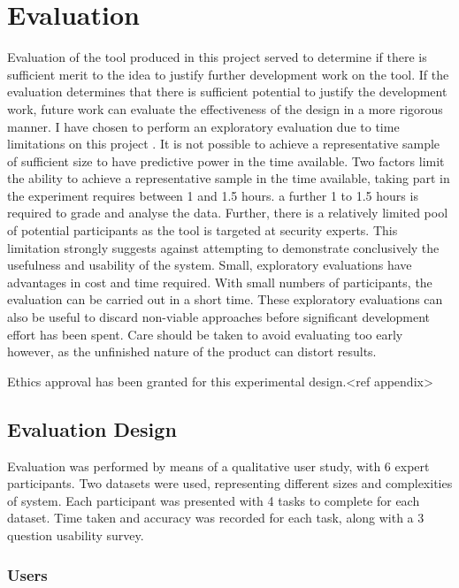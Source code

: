 \chapter{Evaluation}\label{eval}

Evaluation of the tool produced in this project served to determine if there is sufficient merit to the idea to justify further development work on the tool. If the evaluation determines that there is sufficient potential to justify the development work, future work can evaluate the effectiveness of the design in a more rigorous manner. I have chosen to perform an exploratory evaluation due to time limitations on this project \cite{Ellis:2006:EAU:1168149.1168152}. It is not possible to achieve a representative sample of sufficient size to have predictive power in the time available. Two factors limit the ability to achieve a representative sample in the time available, taking part in the experiment requires between 1 and 1.5 hours. a further 1 to 1.5 hours is required to grade and analyse the data. Further, there is a relatively limited pool of potential participants as the tool is targeted at security experts. This limitation strongly suggests against attempting to demonstrate conclusively the usefulness and usability of the system. Small, exploratory evaluations have advantages in cost and time required. With small numbers of participants, the evaluation can be carried out in a short time. These exploratory evaluations can also be useful to discard non-viable approaches before significant development effort has been spent. Care should be taken to avoid evaluating too early however, as the unfinished nature of the product can distort results. 

Ethics approval has been granted for this experimental design.<ref appendix> 

\section{Evaluation Design}

Evaluation was performed by means of a qualitative user study, with 6 expert participants. Two datasets were used, representing different sizes and complexities of system. Each participant was presented with 4 tasks to complete for each dataset. Time taken and accuracy was recorded for each task, along with a 3 question usability survey. 

\subsection{Users}

